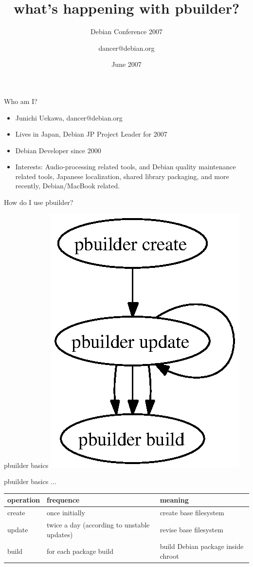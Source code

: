 \documentclass[dvipdfm,12pt,times]{beamer}
\title{what's happening with pbuilder?}
\subtitle{Debian Conference 2007}
\author{dancer@debian.org}
\date{June 2007}
\newcommand{\emtext}[1]{
\begin{frame}{}
 
{\Huge #1
}
\end{frame}
}
\begin{document}
\frame{\titlepage{}}


\begin{frame}{Who am I?}
\begin{itemize}
 \item Junichi Uekawa, dancer@debian.org
 \item Lives in Japan, Debian JP Project Leader for 2007
 \item Debian Developer since 2000
 \item Interests: Audio-processing related tools, and 
       Debian quality maintenance related tools,
       Japanese localization, shared library packaging, 
       and more recently, Debian/MacBook related.
\end{itemize}
\end{frame}


\emtext{How do I use pbuilder?}

\begin{frame}{pbuilder basics}
\includegraphics[height=0.7\vsize]{pbuildercycle.eps}
\end{frame}

\begin{frame}{pbuilder basics ...}
\begin{tabular}{|l|p{9em}|p{10em}|}
\hline
\hline
operation & frequence & meaning \\
\hline
\hline
create & once initially & create base filesystem \\
\hline
update & twice a day (according to unstable updates) & 
 revise base filesystem \\
\hline
build & for each package build & build Debian package inside chroot \\
\hline
\end{tabular}
\end{frame}
\end{document}
